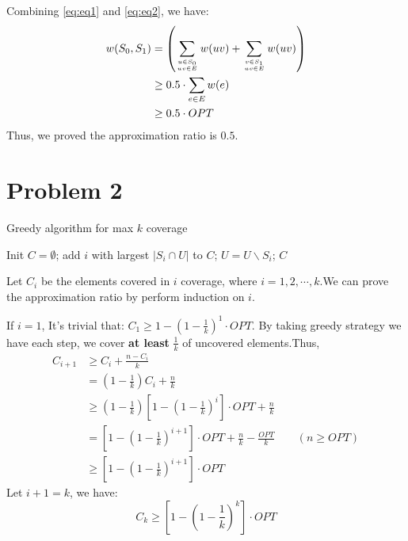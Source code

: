 \documentclass[a4paper, 12pt, titlepage]{article}
\begin{document}
Combining \ref{eq:eq1} and \ref{eq:eq2}, we have:
\begin{equation}
    \begin{aligned}
        w(S_0, S_1) &= \left( \sum_{u \in S_0 \atop uv \in E} w(uv) + \sum_{v \in S_1 \atop uv \in E} w(uv) \right) \\
                    &\geq 0.5 \cdot \sum_{e \in E} w(e) \\
                    &\geq 0.5 \cdot OPT
    \end{aligned}
\end{equation}
Thus, we proved the approximation ratio is $0.5$.
\section{Problem 2}
\begin{algorithm}[h]
    \caption{Greedy algorithm for max $k$ coverage}
    \begin{algorithmic}[1]
        \State Init $C = \emptyset$;
 			\State add $i$ with largest $|S_{i} \cap U|$ to $C$;
 			\State $U = U \backslash S_{i}$;
        \EndWhile
        \State \Return $C$
    \end{algorithmic}
\end{algorithm}

Let $C_{i}$ be the elements covered in $i$ coverage, where $i = 1, 2, \cdots, k$.We can prove the approximation ratio by perform induction on $i$.

If $i = 1$, It's trivial that: $C_{1} \geq 1 - \left( 1 - \frac{1}{k} \right)^{1} \cdot OPT$.
By taking greedy strategy we have each step, we cover \textbf{at least} $\frac{1}{k}$ of uncovered elements.Thus,
\begin{equation}
	\begin{aligned}
		C_{i + 1} &\geq C_{i} + \frac{n - C_{i}}{k} \\
				  &= \left(1 - \frac{1}{k} \right) C_{i} + \frac{n}{k} \\
				  &\geq \left(1 - \frac{1}{k} \right)\left[ 1 - \left( 1 - \frac{1}{k} \right)^{i} \right] \cdot OPT + \frac{n}{k} \\
				  &= \left[ 1 - \left( 1- \frac{1}{k} \right)^{i + 1} \right] \cdot OPT + \frac{n}{k} - \frac{OPT}{k} \qquad (n \geq OPT) \\ 
				  &\geq \left[ 1 - \left( 1- \frac{1}{k} \right)^{i + 1} \right] \cdot OPT
	\end{aligned}
\end{equation}
Let $i + 1 = k$, we have:
\[
	C_{k} \geq \left[ 1 - \left( 1 - \frac{1}{k} \right)^{k} \right] \cdot OPT
\]
\end{document}
